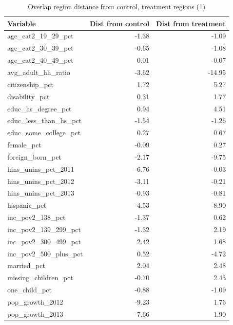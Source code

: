\documentclass[12pt]{article}
\begin{document}
\begin{table}[ht]
\centering
\begin{tabular}{lrr}
  \toprule
Variable & Dist from control & Dist from treatment \\ 
  \midrule
  age\_cat2\_19\_29\_pct & -1.38 & -1.09 \\ 
  age\_cat2\_30\_39\_pct & -0.65 & -1.08 \\ 
  age\_cat2\_40\_49\_pct & 0.01 & -0.07 \\ 
  avg\_adult\_hh\_ratio & -3.62 & -14.95 \\ 
  citizenship\_pct & 1.72 & 5.27 \\ 
  disability\_pct & 0.31 & 1.77 \\ 
  educ\_hs\_degree\_pct & 0.94 & 4.51 \\ 
  educ\_less\_than\_hs\_pct & -1.54 & -1.26 \\ 
  educ\_some\_college\_pct & 0.27 & 0.67 \\ 
  female\_pct & -0.09 & 0.27 \\ 
  foreign\_born\_pct & -2.17 & -9.75 \\ 
  hins\_unins\_pct\_2011 & -6.76 & -0.03 \\ 
  hins\_unins\_pct\_2012 & -3.11 & -0.21 \\ 
  hins\_unins\_pct\_2013 & -0.93 & -0.81 \\ 
  hispanic\_pct & -4.53 & -8.90 \\ 
  inc\_pov2\_138\_pct & -1.37 & 0.62 \\ 
  inc\_pov2\_139\_299\_pct & -1.32 & 2.19 \\ 
  inc\_pov2\_300\_499\_pct & 2.42 & 1.68 \\ 
  inc\_pov2\_500\_plus\_pct & 0.52 & -4.72 \\ 
  married\_pct & 2.04 & 2.48 \\ 
  missing\_children\_pct & -0.70 & 2.43 \\ 
  one\_child\_pct & -0.88 & -1.09 \\ 
  pop\_growth\_2012 & -9.23 & 1.76 \\ 
  pop\_growth\_2013 & -7.66 & 1.90 \\ 
   \bottomrule
\end{tabular}
    \caption{Overlap region distance from control, treatment regions (1)}
    \label{tab:oatedist1}
\end{table}
\end{document}
